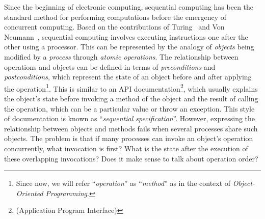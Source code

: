 Since the beginning of electronic computing, sequential computing has been the standard method for performing computations before the emergency of concurrent computing. Based on the contributions of  Turing~\cite{DBLP_journals_x_Turing37} and Von Neumann~\cite{DBLP_journals_annals_Neumann93}, sequential computing involves executing instructions one after the other using a processor. This can be represented by the analogy of \textit{objects} being modified by a \textit{process} through \textit{atomic operations}. The relationship between operations and objects can be defined in terms of \textit{preconditions} and \textit{postconditions}, which represent the state of an object before and after applying the operation\footnote{Since now, we will refer ``\textit{operation}'' as ``\textit{method}'' as in the context of \textit{Object-Oriented Programming}.}. This is similar to an API documentation\footnote{(Application Program Interface)}, which usually explains the object's state before invoking a method of the object and the result of calling the operation, which can be a particular value or throw an exception. This style of documentation is known as ``\textit{sequential specification}''.
However, expressing the relationship between objects and methods fails when several processes share such objects. The problem is that if many processes can invoke an object's operation concurrently, what invocation is first? What is the state after the execution of these overlapping invocations? Does it make sense to talk about operation order?

